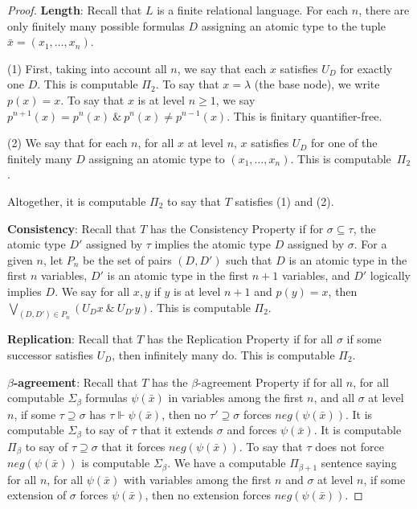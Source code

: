 \documentclass[10pt,a4paper]{amsart}
\begin{document}
\begin{proof}

\noindent
\textbf{Length}:  Recall that $L$ is a finite relational language.  For each $n$, there are only finitely many possible formulas $D$ assigning an atomic type to the tuple $\bar{x} = (x_1,\ldots,x_n)$.  

\noindent
(1)  First, taking into account all $n$, we say that each $x$ satisfies $U_D$ for exactly one $D$.  This is computable $\Pi_2$.  To say that $x = \lambda$ (the base node), we write $p(x) = x$.  To say that $x$ is at level $n\geq 1$, 
we say $p^{n+1}(x) = p^n(x) \ \&\ p^n(x) \not= p^{n-1}(x)$.  This is finitary quantifier-free.           

\noindent
(2)  We say that for each $n$, for all $x$ at level $n$, $x$ satisfies $U_D$ for one of the finitely many $D$  assigning an atomic type to $(x_1,\ldots,x_n)$.  This is computable~$\Pi_2$.

\noindent
Altogether, it is computable $\Pi_2$ to say that $T$ satisfies (1) and (2).      

\bigskip
\noindent
\textbf{Consistency}:  Recall that $T$ has the Consistency Property if for $\sigma\subseteq\tau$, the atomic type $D'$ assigned by $\tau$ implies the atomic type $D$ assigned by $\sigma$.  For a given $n$, let $P_n$ be the set of pairs $(D,D')$ such that $D$ is an atomic type in the first $n$ variables, $D'$ is an atomic type in the first $n+1$ variables, and $D'$ logically implies $D$.  We say for all $x,y$ if $y$ is at level $n+1$ and $p(y) = x$, then $\bigvee_{(D,D')\in P_n} (U_Dx\ \&\ U_{D'}y)$.  This is computable $\Pi_2$.    

\bigskip
\noindent
\textbf{Replication}:  Recall that $T$ has the Replication Property if for all $\sigma$ if some successor satisfies $U_D$, then infinitely many do.  This is computable $\Pi_2$.

\bigskip
\noindent
\textbf{$\beta$-agreement}:  Recall that $T$ has the $\beta$-agreement Property if for all $n$, for all computable $\Sigma_\beta$ formulas $\psi(\bar{x})$ in variables among the first $n$, and all $\sigma$ at level $n$, if some $\tau\supseteq\sigma$ has $\tau\Vdash\psi(\bar{x})$, then no $\tau'\supseteq\sigma$ forces $neg(\psi(\bar{x}))$. 
It is computable $\Sigma_\beta$ to say of $\tau$ that it extends $\sigma$ and forces $\psi(\bar{x})$.  It is computable $\Pi_{\beta}$ to say of $\tau\supseteq\sigma$ that it forces $neg(\psi(\bar{x}))$.  To say that $\tau$ does not force $neg(\psi(\bar{x}))$ is computable $\Sigma_\beta$.  We have a computable $\Pi_{\beta+1}$ sentence saying for all $n$, for all $\psi(\bar{x})$ with variables among the first $n$ and $\sigma$ at level $n$, if some extension of $\sigma$ forces $\psi(\bar{x})$, then no extension forces $neg(\psi(\bar{x}))$.    


\end{proof}
\end{document}
